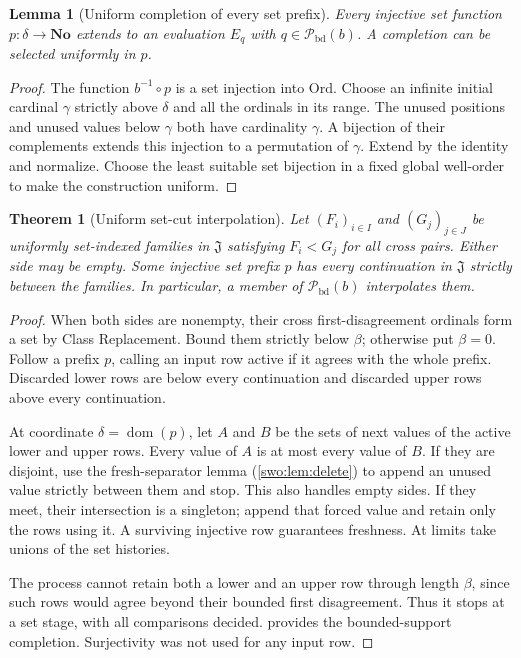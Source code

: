 \documentclass[11pt]{article}
\newtheorem{theorem}{Theorem}[section]
\newtheorem{lemma}[lemma]{Lemma}
\theoremstyle{definition}
\theoremstyle{remark}
\newcommand{\No}{\mathbf{No}}
\newcommand{\Ord}{\mathrm{Ord}}
\newcommand{\Jinj}{\mathfrak J}
\newcommand{\Pbd}{\mathcal P_{\mathrm{bd}}}
\newcommand{\dom}{\operatorname{dom}}
\begin{document}
\begin{lemma}[Uniform completion of every set prefix]\label{swo:ds:lem:completion}
Every injective set function $p:\delta\to\No$ extends to an evaluation
$E_q$ with $q\in \Pbd(b)$. A completion can be selected uniformly in $p$.
\end{lemma}
\begin{proof}
The function $b^{-1}\circ p$ is a set injection into $\Ord$. Choose
an infinite initial cardinal $\gamma$ strictly above $\delta$ and all
the ordinals in its range. The unused positions and unused values below
$\gamma$ both have cardinality $\gamma$. A bijection of their
complements extends this injection to a permutation of $\gamma$.
Extend by the identity and normalize. Choose the least suitable set
bijection in a fixed global well-order to make the construction uniform.
\end{proof}

\begin{theorem}[Uniform set-cut interpolation]\label{swo:ds:thm:interpolation}
Let $(F_i)_{i\in I}$ and $(G_j)_{j\in J}$ be uniformly set-indexed
families in $\Jinj$ satisfying $F_i<G_j$ for all cross pairs. Either side
may be empty. Some injective set prefix $p$ has every continuation in
$\Jinj$ strictly between the families. In particular, a member of $\Pbd(b)$
interpolates them.
\end{theorem}
\begin{proof}
When both sides are nonempty, their cross first-disagreement ordinals
form a set by Class Replacement. Bound them strictly below $\beta$;
otherwise put $\beta=0$. Follow a prefix $p$, calling an input row
active if it agrees with the whole prefix. Discarded lower rows are
below every continuation and discarded upper rows above every
continuation.

At coordinate $\delta=\dom(p)$, let $A$ and $B$ be the sets of next
values of the active lower and upper rows. Every value of $A$ is at
most every value of $B$. If they are disjoint, use
the fresh-separator lemma (\cref{swo:lem:delete}) to append an unused value strictly between them
and stop. This also handles empty sides. If they meet, their intersection
is a singleton; append that forced value and retain only the rows using
it. A surviving injective row guarantees freshness. At limits take
unions of the set histories.

The process cannot retain both a lower and an upper row through length
$\beta$, since such rows would agree beyond their bounded first
disagreement. Thus it stops at a set stage, with all comparisons decided.
 provides the bounded-support completion.
Surjectivity was not used for any input row.
\end{proof}
\end{document}
